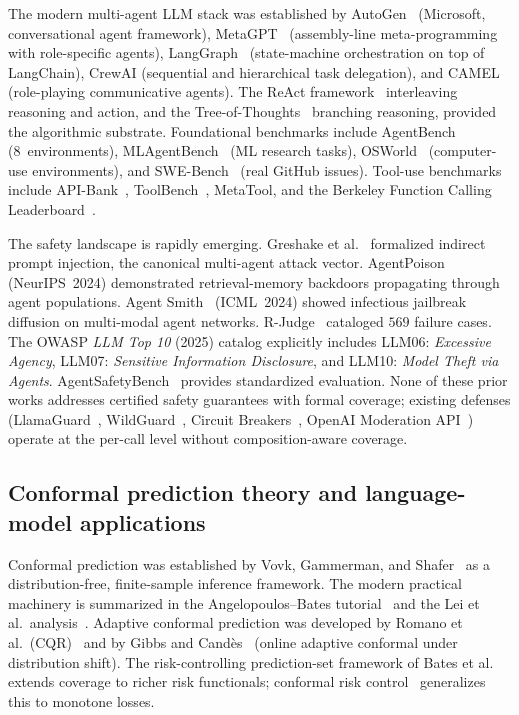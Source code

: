 \documentclass[12pt,a4paper]{article}
\theoremstyle{definition}
\theoremstyle{remark}
\begin{document}
The modern multi-agent LLM stack was established by AutoGen~\cite{wu2023autogen} (Microsoft, conversational agent framework), MetaGPT~\cite{hong2024metagpt} (assembly-line meta-programming with role-specific agents), LangGraph~\cite{langgraph2024} (state-machine orchestration on top of LangChain), CrewAI (sequential and hierarchical task delegation), and CAMEL~\cite{li2023camel} (role-playing communicative agents). The ReAct framework~\cite{yao2023react} interleaving reasoning and action, and the Tree-of-Thoughts~\cite{yao2024tot} branching reasoning, provided the algorithmic substrate. Foundational benchmarks include AgentBench~\cite{liu2024agentbench} (8~environments), MLAgentBench~\cite{huang2024mlagentbench} (ML research tasks), OSWorld~\cite{xie2024osworld} (computer-use environments), and SWE-Bench~\cite{jimenez2024swebench} (real GitHub issues). Tool-use benchmarks include API-Bank~\cite{li2023apibank}, ToolBench~\cite{qin2023toolllm}, MetaTool, and the Berkeley Function Calling Leaderboard~\cite{patil2024bfcl}.

The safety landscape is rapidly emerging. Greshake et al.~\cite{greshake2023indirect} formalized indirect prompt injection, the canonical multi-agent attack vector. AgentPoison~\cite{chen2024agentpoison} (NeurIPS~2024) demonstrated retrieval-memory backdoors propagating through agent populations. Agent Smith~\cite{gu2024agentsmith} (ICML~2024) showed infectious jailbreak diffusion on multi-modal agent networks. R-Judge~\cite{yuan2024rjudge} cataloged $569$ failure cases. The OWASP \emph{LLM Top 10} (2025) catalog explicitly includes LLM06: \emph{Excessive Agency}, LLM07: \emph{Sensitive Information Disclosure}, and LLM10: \emph{Model Theft via Agents}. AgentSafetyBench~\cite{agentsafetybench2024} provides standardized evaluation. None of these prior works addresses certified safety guarantees with formal coverage; existing defenses (LlamaGuard~\cite{inan2023llamaguard}, WildGuard~\cite{han2024wildguard}, Circuit Breakers~\cite{zou2024circuit}, OpenAI Moderation API~\cite{openai2023moderation}) operate at the per-call level without composition-aware coverage.

\subsection{Conformal prediction theory and language-model applications}

Conformal prediction was established by Vovk, Gammerman, and Shafer~\cite{vovk2005algorithmic} as a distribution-free, finite-sample inference framework. The modern practical machinery is summarized in the Angelopoulos--Bates tutorial~\cite{angelopoulos2021gentle} and the Lei et al.\ analysis~\cite{lei2018distribution}. Adaptive conformal prediction was developed by Romano et al.\ (CQR)~\cite{romano2019cqr} and by Gibbs and Cand\`es~\cite{gibbs2021adaptive} (online adaptive conformal under distribution shift). The risk-controlling prediction-set framework of Bates et al.~\cite{bates2021distribution} extends coverage to richer risk functionals; conformal risk control~\cite{angelopoulos2024conformal} generalizes this to monotone losses.
\end{document}
